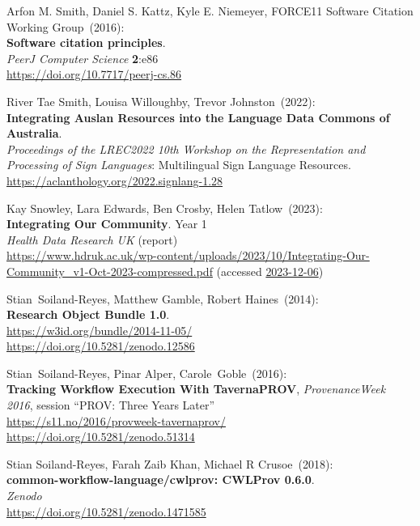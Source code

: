 \begin{thebibliography}{9}
Arfon M. Smith, Daniel S. Kattz, Kyle E. Niemeyer, FORCE11 Software Citation Working Group~(2016):\\
\textbf{Software citation principles}.\\
\emph{PeerJ Computer Science} \textbf{2}:e86\\
\url{https://doi.org/10.7717/peerj-cs.86}

River Tae Smith, Louisa Willoughby, Trevor Johnston~(2022): \\
\textbf{Integrating Auslan Resources into the Language Data Commons of Australia}.\\
\emph{Proceedings of the LREC2022 10th Workshop on the Representation and Processing of Sign Languages}: Multilingual Sign Language Resources.\\
\url{https://aclanthology.org/2022.signlang-1.28}

Kay Snowley, Lara Edwards, Ben Crosby, Helen Tatlow~(2023): \\
\textbf{Integrating Our Community}. Year 1 \\
\emph{Health Data Research UK} (report) \\
\url{https://www.hdruk.ac.uk/wp-content/uploads/2023/10/Integrating-Our-Community_v1-Oct-2023-compressed.pdf}
(accessed \href{}{2023-12-06})

Stian~Soiland-Reyes, Matthew Gamble, Robert Haines~(2014): \\
\textbf{Research Object Bundle 1.0}.\\
\url{https://w3id.org/bundle/2014-11-05/}\\
\url{https://doi.org/10.5281/zenodo.12586}

Stian~Soiland-Reyes, Pinar Alper, Carole~Goble~(2016): \\
\textbf{Tracking Workflow Execution With TavernaPROV},
\emph{ProvenanceWeek 2016}, session ``PROV: Three Years Later''\\
\url{https://s11.no/2016/provweek-tavernaprov/}\\
\url{https://doi.org/10.5281/zenodo.51314}

Stian Soiland-Reyes, Farah Zaib Khan, Michael R Crusoe~(2018): \\
\textbf{common-workflow-language/cwlprov: CWLProv 0.6.0}.\\
\emph{Zenodo}\\
\url{https://doi.org/10.5281/zenodo.1471585}


\end{thebibliography}
